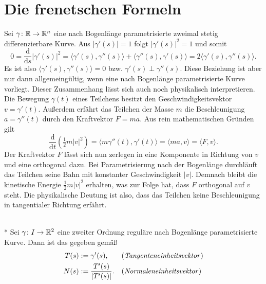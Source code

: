\section{Die frenetschen Formeln}

Sei $\gamma\colon\mathbb R\to\mathbb R^n$ eine nach Bogenlänge parametrisierte
zweimal stetig differenzierbare Kurve. Aus $|\gamma'(s)|=1$ folgt
$|\gamma'(s)|^2=1$ und somit%
\begin{equation}\label{eq:orthogonale-Ableitungen}
0 = \frac{\mathrm d}{\mathrm ds} |\gamma'(s)|^2
= \langle \gamma'(s),\gamma''(s)\rangle + \langle\gamma''(s),\gamma'(s)\rangle
= 2\langle\gamma'(s),\gamma''(s)\rangle.
\end{equation}
Es ist also $\langle\gamma'(s),\gamma''(s)\rangle=0$
bzw. $\gamma'(s)\perp\gamma''(s)$. Diese Beziehung ist aber nur dann
allgemeingültig, wenn eine nach Bogenlänge parametrisierte Kurve
vorliegt. Dieser Zusammenhang lässt sich auch noch physikalisch
interpretieren. Die Bewegung $\gamma(t)$ eines Teilchens besitzt den
Geschwindigkeitsvektor $v=\gamma'(t)$. Außerdem erfährt das Teilchen
der Masse $m$ die Beschleunigung $a=\gamma''(t)$ durch den
Kraftvektor $F=ma$. Aus rein mathematischen Gründen gilt%
\begin{equation}
\frac{\mathrm d}{\mathrm dt}(\tfrac{1}{2}m |v|^2)
= \langle m\gamma''(t),\gamma'(t)\rangle = \langle ma,v\rangle
= \langle F,v\rangle.
\end{equation}
Der Kraftvektor $F$ lässt sich nun zerlegen in eine Komponente in
Richtung von $v$ und eine orthogonal dazu. Bei Parametrisierung
nach der Bogenlänge durchläuft das Teilchen seine Bahn mit konstanter
Geschwindigkeit $|v|$. Demnach bleibt die kinetische Energie
$\tfrac{1}{2}m|v|^2$ erhalten,
was zur Folge hat, dass $F$ orthogonal auf $v$ steht. Die physikalische
Deutung ist also, dass das Teilchen keine Beschleunigung in
tangentialer Richtung erfährt.

\begin{definition}\mbox{}\\*
Sei $\gamma\colon I\to\mathbb R^2$ eine zweiter Ordnung reguläre
nach Bogenlänge parametrisierte Kurve. Dann ist das
 gegeben gemäß
\begin{align}
T(s) &:= \gamma'(s), && \text{(\emph{Tangenteneinheitsvektor})}\\
N(s) &:= \frac{T'(s)}{|T'(s)|}. && \text{(\emph{Normaleneinheitsvektor})}
\end{align}
\end{definition}

